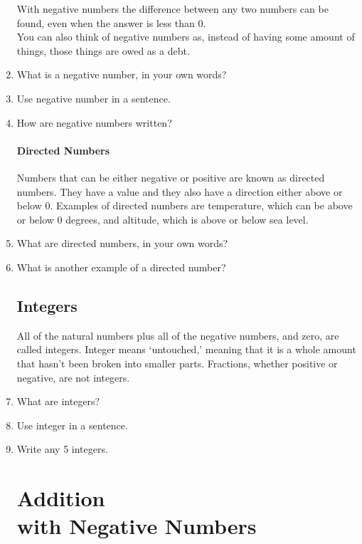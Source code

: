 \documentclass{article}
\begin{document}
\begin{enumerate}

 With negative numbers the difference between any two numbers can be found, even when the answer is less than 0.\\

 You can also think of negative numbers as, instead of having some amount of things, those things are owed as a debt.

\item What is a negative number, in your own words?
\item Use negative number in a sentence.
\item How are negative numbers written?

\paragraph{Directed Numbers}
Numbers that can be either negative or positive are known as directed numbers. They have a value and they also have a direction either above or below 0. Examples of directed numbers are temperature, which can be above or below 0 degrees, and altitude, which is above or below sea level.

\item What are directed numbers, in your own words?
\item What is another example of a directed number?

\subsection*{Integers} 
All of the natural numbers plus all of the negative numbers, and zero, are called integers. Integer means ‘untouched,’ meaning that it is a whole amount that hasn't been broken into smaller parts. Fractions, whether positive or negative, are not integers.

\item What are integers?
\item Use integer in a sentence.
\item Write any 5 integers.

\section*{Addition\\ with Negative Numbers}


\end{enumerate}
\end{document}
